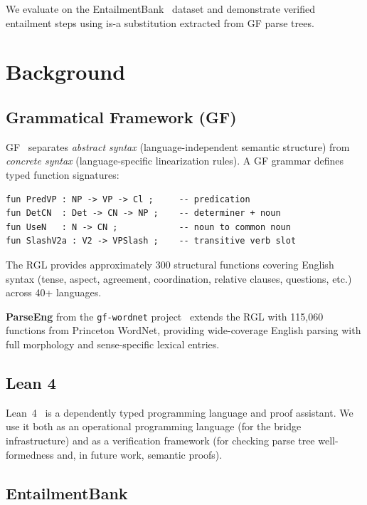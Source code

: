 \documentclass[]{article}
\newcommand{\code}[1]{\texttt{#1}}
\begin{document}
We evaluate on the EntailmentBank~\cite{dalvi2021entailmentbank}
dataset and demonstrate verified entailment steps using is-a substitution
extracted from GF parse trees.

\section{Background}
\label{sec:background}

\subsection{Grammatical Framework (GF)}

GF~\cite{ranta2004gf} separates \emph{abstract syntax} (language-independent
semantic structure) from \emph{concrete syntax} (language-specific
linearization rules). A GF grammar defines typed function signatures:

\begin{lstlisting}
fun PredVP : NP -> VP -> Cl ;     -- predication
fun DetCN  : Det -> CN -> NP ;    -- determiner + noun
fun UseN   : N -> CN ;            -- noun to common noun
fun SlashV2a : V2 -> VPSlash ;    -- transitive verb slot
\end{lstlisting}

The RGL provides approximately 300 structural functions covering
English syntax (tense, aspect, agreement, coordination, relative clauses,
questions, etc.) across 40+ languages.

\textbf{ParseEng} from the \code{gf-wordnet} project~\cite{angelov2020wordnet}
extends the RGL with 115{,}060 functions from Princeton WordNet, providing
wide-coverage English parsing with full morphology and sense-specific
lexical entries.

\subsection{Lean 4}

Lean~4~\cite{demoura2021lean4} is a dependently typed programming language
and proof assistant. We use it both as an operational programming language
(for the bridge infrastructure) and as a verification framework (for
checking parse tree well-formedness and, in future work, semantic proofs).

\subsection{EntailmentBank}
\end{document}
